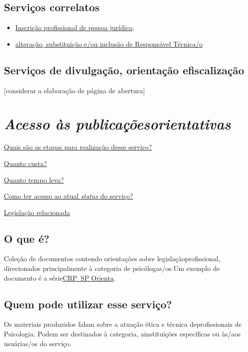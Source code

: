 \section{Serviços correlatos}

\begin{itemize}
  \item  \hyperref[]{Inscrição  profissional de pessoa jurídica};
  \item  \hyperref[]{alteração,  substituição e/ou inclusão de Responsável Técnica/o}
\end{itemize}

\section{Serviços de divulgação, orientação efiscalização}

{[}considerar a elaboração de página de abertura{]}

\chapter{\texorpdfstring{\emph{Acesso às publicaçõesorientativas}}{Acesso às publicações orientativas}}
\hyperref[]{Quais são as etapas para realização desse serviço?}

\hyperref[]{Quanto custa?}

\hyperref[]{Quanto tempo leva?}

\hyperref[]{Como ter acesso ao atual \emph{status} do serviço?}

\hyperref[]{Legislação relacionada}

\section{O que é?}

Coleção de documentos contendo orientações sobre legislaçãoprofissional, direcionados principalmente à categoria de psicólogas/os.Um exemplo de documento é a série\href{https://www.crpsp.org/impresso/index?categoria=9}{CRP~SP Orienta}.

\section{Quem pode utilizar esse serviço?}

Os materiais produzidos falam sobre a atuação ética e técnica deprofissionais de Psicologia. Podem ser destinados à categoria, ainstituições específicas ou às/aos usuárias/os do serviço.

